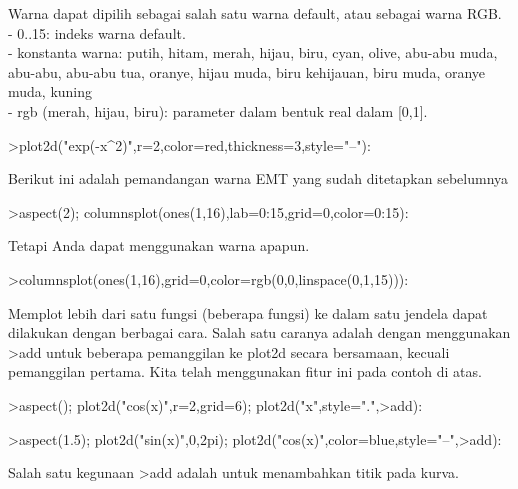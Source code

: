 \documentclass[a4paper,10pt]{article}
\begin{document}
\begin{eulernotebook}
\begin{eulercomment}
\begin{eulercomment}
\begin{eulercomment}
Warna dapat dipilih sebagai salah satu warna default, atau sebagai
warna RGB. \\
- 0..15: indeks warna default. \\
- konstanta warna: putih, hitam, merah, hijau, biru, cyan, olive,
abu-abu muda, abu-abu, abu-abu tua, oranye, hijau muda, biru
kehijauan, biru muda, oranye muda, kuning \\
- rgb (merah, hijau, biru): parameter dalam bentuk real dalam [0,1].
\end{eulercomment}
\begin{eulerprompt}
>plot2d("exp(-x^2)",r=2,color=red,thickness=3,style="--"):
\end{eulerprompt}
\begin{eulercomment}
Berikut ini adalah pemandangan warna EMT yang sudah ditetapkan
sebelumnya
\end{eulercomment}
\begin{eulerprompt}
>aspect(2); columnsplot(ones(1,16),lab=0:15,grid=0,color=0:15):
\end{eulerprompt}
\begin{eulercomment}
Tetapi Anda dapat menggunakan warna apapun.
\end{eulercomment}
\begin{eulerprompt}
>columnsplot(ones(1,16),grid=0,color=rgb(0,0,linspace(0,1,15))):
\end{eulerprompt}
\begin{eulercomment}
Memplot lebih dari satu fungsi (beberapa fungsi) ke dalam satu jendela
dapat dilakukan dengan berbagai cara. Salah satu caranya adalah dengan
menggunakan \textgreater{}add untuk beberapa pemanggilan ke plot2d secara
bersamaan, kecuali pemanggilan pertama. Kita telah menggunakan fitur
ini pada contoh di atas.
\end{eulercomment}
\begin{eulerprompt}
>aspect(); plot2d("cos(x)",r=2,grid=6); plot2d("x",style=".",>add):
\end{eulerprompt}
\begin{eulerprompt}
>aspect(1.5); plot2d("sin(x)",0,2pi); plot2d("cos(x)",color=blue,style="--",>add):
\end{eulerprompt}
\begin{eulercomment}
Salah satu kegunaan \textgreater{}add adalah untuk menambahkan titik pada kurva.


\end{eulercomment}
\end{eulercomment}
\end{eulercomment}
\end{eulernotebook}
\end{document}
